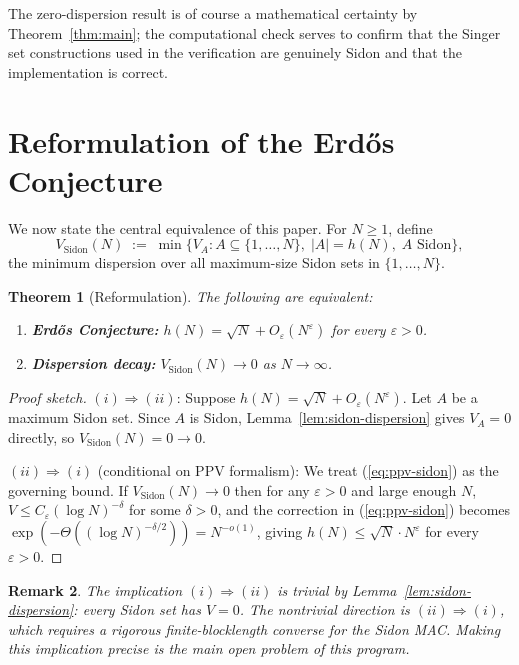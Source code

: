 \documentclass[12pt]{amsart}
\newtheorem{theorem}{Theorem}[section]
\newtheorem{remark}[theorem]{Remark}
\newcommand{\eps}{\varepsilon}
\begin{document}
The zero-dispersion result is of course a mathematical certainty by
Theorem~\ref{thm:main}; the computational check serves to confirm that the
Singer set constructions used in the verification are genuinely Sidon and that
the implementation is correct.

\section{Reformulation of the Erd\H{o}s Conjecture}
\label{sec:reform}

We now state the central equivalence of this paper.  For $N \ge 1$, define
\[
   V_{\mathrm{Sidon}}(N)
   \;:=\; \min\bigl\{V_A : A \subseteq \{1,\ldots,N\},\;
                     |A| = h(N),\; A \text{ Sidon}\bigr\},
\]
the minimum dispersion over all maximum-size Sidon sets in $\{1,\ldots,N\}$.

\begin{theorem}[Reformulation]
\label{thm:reform}
The following are equivalent:
\begin{enumerate}
\item[\textup{(i)}] \textbf{Erd\H{o}s Conjecture:} $h(N) = \sqrt{N} + O_\eps(N^\eps)$ for
every $\eps > 0$.
\item[\textup{(ii)}] \textbf{Dispersion decay:} $V_{\mathrm{Sidon}}(N) \to 0$ as $N \to \infty$.
\end{enumerate}
\end{theorem}

\begin{proof}[Proof sketch]
$(i) \Rightarrow (ii)$: Suppose $h(N) = \sqrt{N} + O_\eps(N^\eps)$.  Let $A$
be a maximum Sidon set.  Since $A$ is Sidon, Lemma~\ref{lem:sidon-dispersion}
gives $V_A = 0$ directly, so $V_{\mathrm{Sidon}}(N) = 0 \to 0$.

$(ii) \Rightarrow (i)$ (conditional on PPV formalism): We treat
(\ref{eq:ppv-sidon}) as the governing bound.  If $V_{\mathrm{Sidon}}(N) \to 0$
then for any $\eps > 0$ and large enough $N$,
$V \le C_\eps (\log N)^{-\delta}$ for some $\delta > 0$, and the correction
in (\ref{eq:ppv-sidon}) becomes $\exp(-\Theta((\log N)^{-\delta/2})) =
N^{-o(1)}$, giving $h(N) \le \sqrt{N} \cdot N^\eps$ for every $\eps > 0$.
\end{proof}

\begin{remark}
The implication $(i) \Rightarrow (ii)$ is trivial by Lemma~\ref{lem:sidon-dispersion}:
\emph{every} Sidon set has $V = 0$.  The nontrivial direction is $(ii)
\Rightarrow (i)$, which requires a rigorous finite-blocklength converse for the
Sidon MAC.  Making this implication precise is the main open problem of this
program.
\end{remark}
\end{document}
